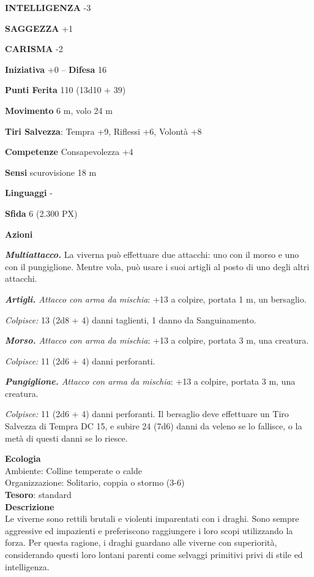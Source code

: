 \begin{multicols}{2}
\textbf{INTELLIGENZA} -3

\textbf{SAGGEZZA} +1

\textbf{CARISMA} -2

\textbf{Iniziativa} +0 -- \textbf{Difesa} 16

\textbf{Punti Ferita} 110 (13d10 + 39)

\textbf{Movimento} 6 m, volo 24 m

\textbf{Tiri Salvezza}: Tempra +9, Riflessi +6, Volontà +8

\textbf{Competenze} Consapevolezza +4

\textbf{Sensi} scurovisione 18 m

\textbf{Linguaggi} -

\textbf{Sfida} 6 (2.300 PX)

\textbf{Azioni}

\textit{\textbf{Multiattacco.}} La viverna può effettuare due attacchi: uno con il morso e uno con il pungiglione. Mentre vola, può usare i suoi artigli al posto di uno degli altri attacchi.

\textit{\textbf{Artigli.} Attacco con arma da mischia}: +13 a colpire, portata 1 m, un bersaglio.

\textit{Colpisce:} 13 (2d8 + 4) danni taglienti, 1 danno da Sanguinamento.

\textit{\textbf{Morso.} Attacco con arma da mischia}: +13 a colpire, portata 3 m, una creatura.

\textit{Colpisce:} 11 (2d6 + 4) danni perforanti.

\textit{\textbf{Pungiglione.} Attacco con arma da mischia}: +13 a colpire, portata 3 m, una creatura.

\textit{Colpisce:} 11 (2d6 + 4) danni perforanti. Il bersaglio deve effettuare un Tiro Salvezza di Tempra DC 15, e subire 24 (7d6) danni da veleno se lo fallisce, o la metà di questi danni se lo riesce.

\textbf{Ecologia}\\
Ambiente: Colline temperate o calde\\
Organizzazione: Solitario, coppia o stormo (3-6)\\
\textbf{Tesoro}: standard\\
\textbf{Descrizione}\\
Le viverne sono rettili brutali e violenti imparentati con i draghi. Sono sempre aggressive ed impazienti e preferiscono raggiungere i loro scopi utilizzando la forza. Per questa ragione, i draghi guardano alle viverne con superiorità, considerando questi loro lontani parenti come selvaggi primitivi privi di stile ed intelligenza.


\end{multicols}
